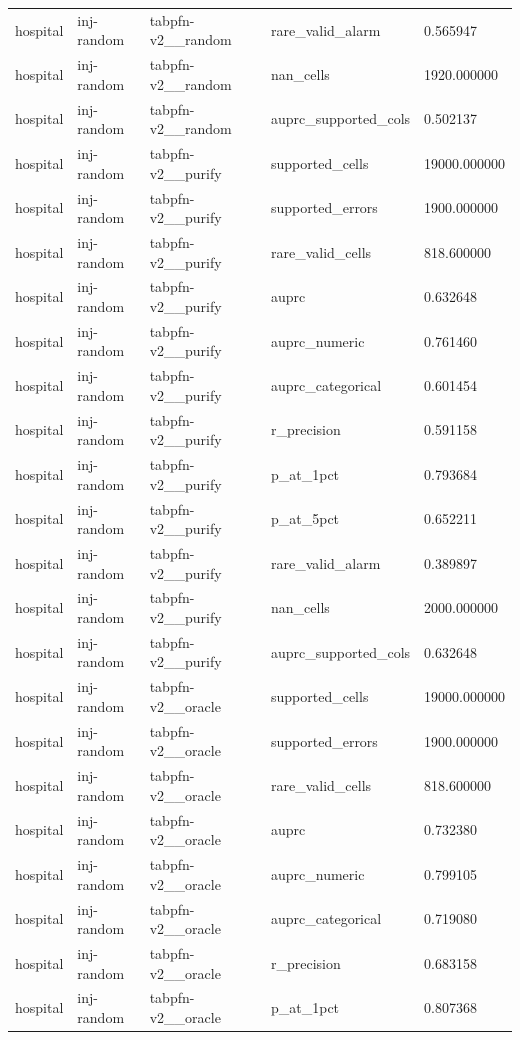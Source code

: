 \begin{tabular}{lllll}
hospital & inj-random & tabpfn-v2\_\_random & rare\_valid\_alarm & 0.565947 \\
hospital & inj-random & tabpfn-v2\_\_random & nan\_cells & 1920.000000 \\
hospital & inj-random & tabpfn-v2\_\_random & auprc\_supported\_cols & 0.502137 \\
hospital & inj-random & tabpfn-v2\_\_purify & supported\_cells & 19000.000000 \\
hospital & inj-random & tabpfn-v2\_\_purify & supported\_errors & 1900.000000 \\
hospital & inj-random & tabpfn-v2\_\_purify & rare\_valid\_cells & 818.600000 \\
hospital & inj-random & tabpfn-v2\_\_purify & auprc & 0.632648 \\
hospital & inj-random & tabpfn-v2\_\_purify & auprc\_numeric & 0.761460 \\
hospital & inj-random & tabpfn-v2\_\_purify & auprc\_categorical & 0.601454 \\
hospital & inj-random & tabpfn-v2\_\_purify & r\_precision & 0.591158 \\
hospital & inj-random & tabpfn-v2\_\_purify & p\_at\_1pct & 0.793684 \\
hospital & inj-random & tabpfn-v2\_\_purify & p\_at\_5pct & 0.652211 \\
hospital & inj-random & tabpfn-v2\_\_purify & rare\_valid\_alarm & 0.389897 \\
hospital & inj-random & tabpfn-v2\_\_purify & nan\_cells & 2000.000000 \\
hospital & inj-random & tabpfn-v2\_\_purify & auprc\_supported\_cols & 0.632648 \\
hospital & inj-random & tabpfn-v2\_\_oracle & supported\_cells & 19000.000000 \\
hospital & inj-random & tabpfn-v2\_\_oracle & supported\_errors & 1900.000000 \\
hospital & inj-random & tabpfn-v2\_\_oracle & rare\_valid\_cells & 818.600000 \\
hospital & inj-random & tabpfn-v2\_\_oracle & auprc & 0.732380 \\
hospital & inj-random & tabpfn-v2\_\_oracle & auprc\_numeric & 0.799105 \\
hospital & inj-random & tabpfn-v2\_\_oracle & auprc\_categorical & 0.719080 \\
hospital & inj-random & tabpfn-v2\_\_oracle & r\_precision & 0.683158 \\
hospital & inj-random & tabpfn-v2\_\_oracle & p\_at\_1pct & 0.807368 \\

\end{tabular}
